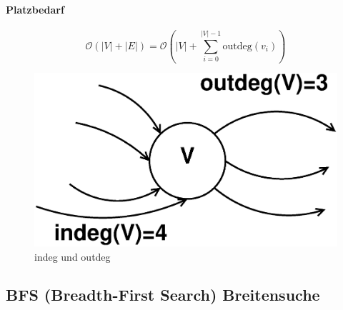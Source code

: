\paragraph{Platzbedarf}
\[ \mathcal{O}(|V|+|E|)=\mathcal{O}\left( |V|+\sum_{i=0}^{|V|-1}\text{outdeg}(v_i) \right) \]
\begin{figure}[h]
\centering
\includegraphics[width=0.3\linewidth]{15/Grafik/deg}
\caption{indeg und outdeg}
\label{fig:deg}
\end{figure}

\subsection{BFS (Breadth-First Search) Breitensuche}
